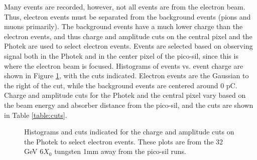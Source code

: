 \documentclass[twocolumn,aps,prd,reprint]{revtex4-1}
\begin{document}
Many events are recorded, however, not all events are from the electron beam. Thus, electron events must be separated from the background events (pions and muons primarily). The background events have a much lower charge than the electron events, and thus charge and amplitude cuts on the central pixel and the Photek are used to select electron events. Events are selected based on observing signal both in the Photek and in the center pixel of the pico-sil, since this is where the electron beam is focused. Histograms of events vs. event charge are shown in Figure \ref{charge amp cuts}, with the cuts indicated. Electron events are the Gaussian to the right of the cut, while the background events are centered around 0 pC. Charge and amplitude cuts for the Photek and the central pixel vary based on the beam energy and absorber distance from the pico-sil, and the cuts are shown in Table \ref{table:cuts}.

\begin{figure}[!htbp]
\caption{Histograms and cuts indicated for the charge and amplitude cuts on the Photek to select electron events. These plots are from the 32 GeV $6X_0$ tungsten 1mm away from the pico-sil runs.}
\label{charge amp cuts}
\end{figure}
\end{document}
